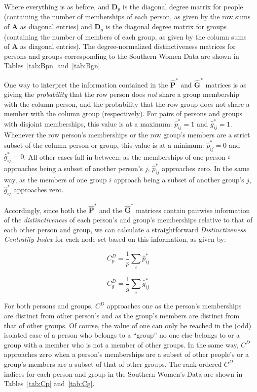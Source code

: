 \documentclass[a4paper,fleqn]{cas-sc}
\begin{document}
Where everything is as before, and $\textbf{D}_p$ is the diagonal degree matrix for people (containing the number of memberships of each person, as given by the row sums of $\mathbf{A}$ as diagonal entries) and $\textbf{D}_g$ is the diagonal degree matrix for groups (containing the number of members of each group, as given by the column sums of $\mathbf{A}$ as diagonal entries). The degree-normalized distinctiveness matrices for persons and groups corresponding to the Southern Women Data are shown in Tables~\ref{tab:Bpn} and~\ref{tab:Bgn}.




One way to interpret the information contained in the $\hat{\textbf{P}}^*$ and $\hat{\textbf{G}}^*$ matrices is as giving the \textit{probability} that the row person does \textit{not} share a group membership with the column person, and the probability that the row group does not share a member with the column group (respectively). For pairs of persons and groups with disjoint memberships, this value is at a maximum: $\hat{p}_{ij}^* = 1$ and $\hat{g}_{ij}^* = 1$. Whenever the row person's memberships or the row group's members are a strict subset of the column person or group, this value is at a minimum: $\hat{p}_{ij}^* = 0$ and $\hat{g}_{ij}^* = 0$. All other cases fall in between; as the memberships of one person $i$ approaches being a subset of another person's $j$, $\hat{p}_{ij}^*$ approaches zero. In the same way, as the members of one group $i$ approach being a subset of another group's $j$, $\hat{g}_{ij}^*$ approaches zero. 

Accordingly, since both the $\hat{\textbf{P}}^*$ and the $\hat{\textbf{G}}^*$ matrices contain pairwise information of the \textit{distinctiveness} of each person's and group's memberships relative to that of each other person and group, we can calculate a straightforward \textit{Distinctiveness Centrality Index} for each node set based on this information, as given by:

\begin{equation}
    C^{D}_p = \frac{1}{p}\sum_i \hat{p}_{ij}^*
\end{equation}

\begin{equation}
     C^{D}_g = \frac{1}{g}\sum_i \hat{g}_{ij}^*
\end{equation}

For both persons and groups, $C^{D}$ approaches one as the person's memberships are distinct from other person's and as the group's members are distinct from that of other groups. Of course, the value of one can only be reached in the (odd) isolated case of a person who belongs to a ``group'' no one else belongs to or a group with a member who is not a member of other groups. In the same way, $C^{D}$ approaches zero when a person's memberships are a subset of other people's or a group's members are a subset of that of other groups. The rank-ordered $C^D$ indices for each person and group in the Southern Women's Data are shown in Tables~\ref{tab:Cp} and~\ref{tab:Cg}.





% 



\end{document}
